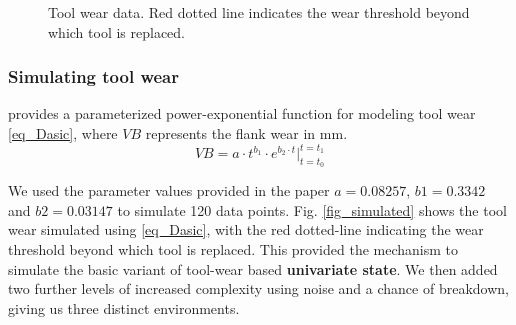 \documentclass[referee, sn-mathphys-num]{sn-jnl}
\begin{document}
	\begin{figure}
		\centering	
		\hfill
		\par\bigskip
		\centering	
		\hfill
		\caption{Tool wear data. Red dotted line indicates the wear threshold beyond which tool is replaced.}
		\label{fig_tool wear-plots}
	\end{figure}
	
	\subsubsection*{Simulating tool wear}
	\cite{dasic2006} provides a parameterized power-exponential function for modeling tool wear \eqref{eq_Dasic}, where $VB$ represents the flank wear in mm.
	\begin{equation}
		VB = a \cdot t^{b_1} \cdot e^{b_2 \cdot t} \Big|_{t=t_0}^{t=t_1}
		\label{eq_Dasic}
	\end{equation}
	
	We used the parameter values provided in the paper $a=0.08257$, $b1=0.3342$ and $b2=0.03147$ to simulate 120 data points. Fig. \ref{fig_simulated} shows the tool wear simulated using \eqref{eq_Dasic}, with the red dotted-line indicating the wear threshold beyond which tool is replaced. This provided the mechanism to simulate the basic variant of tool-wear based \textbf{univariate state}. We then added two further levels of increased complexity using noise and a chance of breakdown, giving us three distinct environments. 
	
\end{document}
